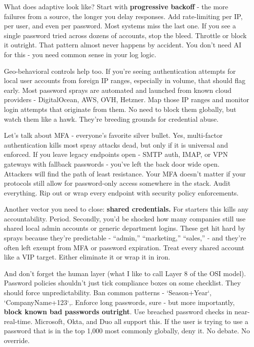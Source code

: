 What does adaptive look like? Start with \textbf{progressive backoff} - the more failures from a source, the longer you delay responses. Add rate-limiting per IP, per user, and even per password. Most systems miss the last one. If you see a single password tried across dozens of accounts, stop the bleed. Throttle or block it outright. That pattern almost never happens by accident. You don’t need AI for this - you need common sense in your log logic.

Geo-behavioral controls help too. If you’re seeing authentication attempts for local user accounts from foreign IP ranges, especially in volume, that should flag early. Most password sprays are automated and launched from known cloud providers - DigitalOcean, AWS, OVH, Hetzner. Map those IP ranges and monitor login attempts that originate from them. No need to block them globally, but watch them like a hawk. They’re breeding grounds for credential abuse.

Let’s talk about MFA - everyone’s favorite silver bullet. Yes, multi-factor authentication kills most spray attacks dead, but only if it is universal and enforced. If you leave legacy endpoints open - SMTP auth, IMAP, or VPN gateways with fallback passwords - you’ve left the back door wide open. Attackers will find the path of least resistance. Your MFA doesn’t matter if your protocols still allow for password-only access somewhere in the stack. Audit everything. Rip out or wrap every endpoint with security policy enforcements.

Another vector you need to close: \textbf{shared credentials. }For starters this kills any accountability. Period. Secondly, you’d be shocked how many companies still use shared local admin accounts or generic department logins. These get hit hard by sprays because they’re predictable - “admin,” “marketing,” “sales,” - and they’re often left exempt from MFA or password expiration. Treat every shared account like a VIP target. Either eliminate it or wrap it in iron.

And don’t forget the human layer (what I like to call Layer 8 of the OSI model). Password policies shouldn’t just tick compliance boxes on some checklist. They should force unpredictability. Ban common patterns - `Season+Year`, `CompanyName+123`,. Enforce long passwords, sure - but more importantly, \textbf{block known bad passwords outright}. Use breached password checks in near-real-time. Microsoft, Okta, and Duo all support this. If the user is trying to use a password that is in the top 1,000 most commonly globally, deny it. No debate. No override.

